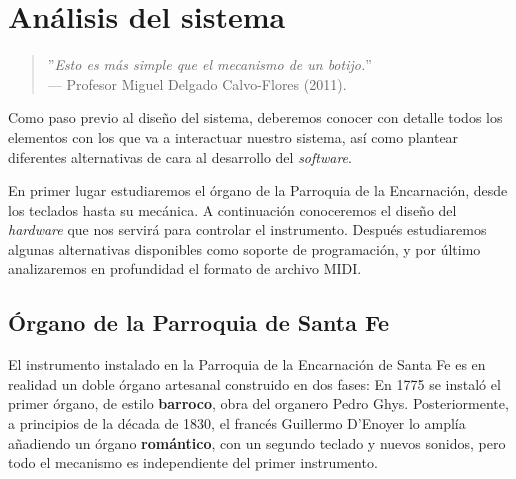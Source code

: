 \chapter{Análisis del sistema}
\label{cap:capitulo_3}

\begin{quote}
	\small \flushright ''\textit{Esto es más simple que el mecanismo de un botijo.}'' \\
	--- Profesor Miguel Delgado Calvo-Flores (2011).
\end{quote}

\vspace{8em}

Como paso previo al diseño del sistema, deberemos conocer con detalle todos los elementos con los que va a interactuar nuestro sistema, así como plantear diferentes alternativas de cara al desarrollo del \textit{software}.

En primer lugar estudiaremos el órgano de la Parroquia de la Encarnación, desde los teclados hasta su mecánica. A continuación conoceremos el diseño del \textit{hardware} que nos servirá para controlar el instrumento. Después estudiaremos algunas alternativas disponibles como soporte de programación, y por último analizaremos en profundidad el formato de archivo \acrshort{MIDI}.

\newpage

\section{Órgano de la Parroquia de Santa Fe}

El instrumento instalado en la Parroquia de la Encarnación de Santa Fe es en realidad un doble órgano artesanal construido en dos fases: En 1775 se instaló el primer órgano, de estilo \textbf{barroco}, obra del organero Pedro Ghys. Posteriormente, a principios de la década de 1830, el francés Guillermo D'Enoyer lo amplía añadiendo un órgano \textbf{romántico}, con un segundo teclado y nuevos sonidos, pero todo el mecanismo es independiente del primer instrumento.

\smallskip

